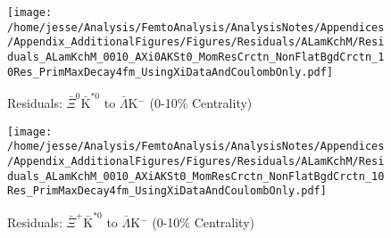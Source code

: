 \documentclass[/home/jesse/Analysis/FemtoAnalysis/AnalysisNotes/AnalysisNoteJBuxton.tex]{subfiles}
\begin{document}
\begin{figure}[h]
  \centering
  \texttt{[image: /home/jesse/Analysis/FemtoAnalysis/AnalysisNotes/Appendices/Appendix\_AdditionalFigures/Figures/Residuals/ALamKchM/Residuals\_ALamKchM\_0010\_AXi0AKSt0\_MomResCrctn\_NonFlatBgdCrctn\_10Res\_PrimMaxDecay4fm\_UsingXiDataAndCoulombOnly.pdf]}
  \caption[Residuals: $\bar{\Xi}^{0}\bar{\mathrm{K}}^{*0}$ to $\bar{\Lambda}$K$^{-}$ (0-10\% Centrality)]{Residuals: $\bar{\Xi}^{0}\bar{\mathrm{K}}^{*0}$ to $\bar{\Lambda}$K$^{-}$ (0-10\% Centrality)}
  \label{fig:Res_ALamKchM_0010_AXi0AKSt0}
\end{figure}

\begin{figure}[h]
  \centering
  \texttt{[image: /home/jesse/Analysis/FemtoAnalysis/AnalysisNotes/Appendices/Appendix\_AdditionalFigures/Figures/Residuals/ALamKchM/Residuals\_ALamKchM\_0010\_AXiAKSt0\_MomResCrctn\_NonFlatBgdCrctn\_10Res\_PrimMaxDecay4fm\_UsingXiDataAndCoulombOnly.pdf]}
  \caption[Residuals: $\bar{\Xi}^{+}\bar{\mathrm{K}}^{*0}$ to $\bar{\Lambda}$K$^{-}$ (0-10\% Centrality)]{Residuals: $\bar{\Xi}^{+}\bar{\mathrm{K}}^{*0}$ to $\bar{\Lambda}$K$^{-}$ (0-10\% Centrality)}
  \label{fig:Res_ALamKchM_0010_AXiCAKSt0}
\end{figure}
\end{document}
